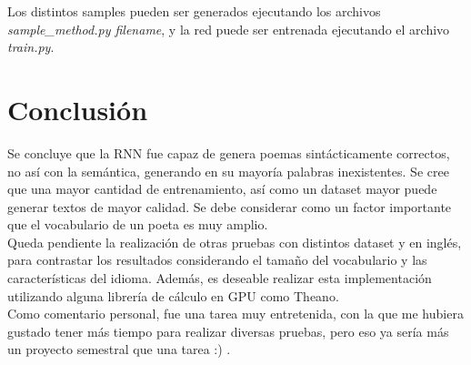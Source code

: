 \documentclass[11pt,letterpaper]{article}
\begin{document}
Los distintos samples pueden ser generados ejecutando los archivos 
\textit{sample\_method.py filename}, y la red puede ser entrenada ejecutando el archivo \textit{train.py}.

\section{Conclusión}
Se concluye que la RNN fue capaz de genera poemas sintácticamente correctos, no así con 
la semántica, generando en su mayoría palabras inexistentes. Se cree que una mayor cantidad de 
entrenamiento, así como un dataset mayor puede generar textos de mayor calidad. Se debe considerar como 
un factor importante que el vocabulario de un poeta es muy amplio.\\

Queda pendiente la realización de otras pruebas con distintos dataset y en inglés, para contrastar los 
resultados considerando el tamaño del vocabulario y las características del idioma. Además, es deseable 
realizar esta implementación utilizando alguna librería de cálculo en GPU como Theano.\\

Como comentario personal, fue una tarea muy entretenida, con la que me hubiera gustado tener más tiempo 
para realizar diversas pruebas, pero eso ya sería más un proyecto semestral que una tarea :) .

\end{document}
